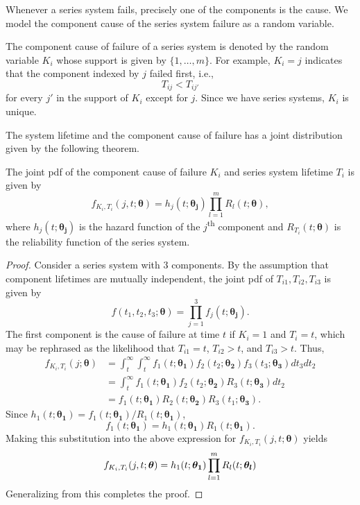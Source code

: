 \documentclass[
]{article}
\begin{document}
Whenever a series system fails, precisely one of the components is the
cause. We model the component cause of the series system failure as a
random variable.

\begin{definition}
The component cause of failure of a series system is
denoted by the random variable $K_i$ whose support is given by $\{1,\ldots,m\}$.
For example, $K_i=j$ indicates that the component indexed by $j$ failed first, i.e.,
$$
    T_{i j} < T_{i j'}
$$
for every $j'$ in the support of $K_i$ except for $j$.
Since we have series systems, $K_i$ is unique.
\end{definition}

The system lifetime and the component cause of failure has a joint
distribution given by the following theorem.

\begin{theorem}
\label{thm:f_k_and_t}
The joint pdf of the component cause of failure $K_i$ and series system lifetime
$T_i$ is given by
\begin{equation}
\label{eq:f_k_and_t}
  f_{K_i,T_i}(j,t;\boldsymbol{\theta}) = h_j(t;\boldsymbol{\theta_j}) \prod_{l=1}^m R_l(t;\boldsymbol{\theta}),
\end{equation}
where $h_j(t;\boldsymbol{\theta_j})$ is the hazard function of the $j$\textsuperscript{th}
component and $R_{T_i}(t;\boldsymbol{\theta})$ is the reliability function of the series
system.
\end{theorem}
\begin{proof}
Consider a series system with $3$ components.
By the assumption that component lifetimes are mutually independent,
the joint pdf of $T_{i 1},T_{i 2},T_{i 3}$ is given by
$$
    f(t_1,t_2,t_3;\boldsymbol{\theta}) = \prod_{j=1}^{3} f_j(t;\boldsymbol{\theta_j}).
$$
The first component is the cause of failure at time $t$ if $K_i = 1$ and
$T_i = t$, which may be rephrased as the likelihood that $T_{i 1} = t$,
$T_{i 2} > t$, and $T_{i 3} > t$. Thus,
\begin{align*}
f_{K_i,T_i}(j;\boldsymbol{\theta}) 
    &= \int_t^{\infty} \int_t^{\infty}
        f_1(t;\boldsymbol{\theta_1}) f_2(t_2;\boldsymbol{\theta_2}) f_3(t_3;\boldsymbol{\theta_3})
        dt_3 dt_2\\
     &= \int_t^{\infty} f_1(t;\boldsymbol{\theta_1}) f_2(t_2;\boldsymbol{\theta_2})
        R_3(t;\boldsymbol{\theta_3}) dt_2\\
     &= f_1(t;\boldsymbol{\theta_1}) R_2(t;\boldsymbol{\theta_2}) R_3(t_1;\boldsymbol{\theta_3}).
\end{align*}
Since $h_1(t;\boldsymbol{\theta_1}) = f_1(t;\boldsymbol{\theta_1}) / R_1(t;\boldsymbol{\theta_1})$,
$$
f_1(t;\boldsymbol{\theta_1}) = h_1(t;\boldsymbol{\theta_1}) R_1(t;\boldsymbol{\theta_1}).
$$
Making this substitution into the above expression for $f_{K_i,T_i}(j,t;\boldsymbol{\theta})$
yields
$$
f_{K_i,T_i}(j,t;\boldsymbol{\theta}) = h_1(t;\boldsymbol{\theta_1}) \prod_{l=1}^m R_l(t;\boldsymbol{\theta_l})\\
$$
Generalizing from this completes the proof.
\end{proof}
\end{document}
